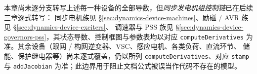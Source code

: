 本章尚未逐分支转写上述每一种设备的全部导数，但\emph{同步发电机组控制链}已在后续三章逐式转写：
同步电机族见 \S\ref{sec:dynamics-device-machines}、励磁 / AVR 族见 \S\ref{sec:dynamics-device-exciters}、
调速器与 PSS 族见 \S\ref{sec:dynamics-device-governors-pss}，其状态导数、控制框图与参数表均以对应
\texttt{computeDerivatives} 为准。其余设备（跟网 / 构网逆变器、VSC、感应电机、各类负荷、直流环节、
储能、保护继电器等）尚未逐式覆盖，仍以所列 \texttt{computeDerivatives}、对应 \texttt{stamp} 与
\texttt{addJacobian} 为准；此边界用于阻止文档公式被误当作代码不存在的模型。
